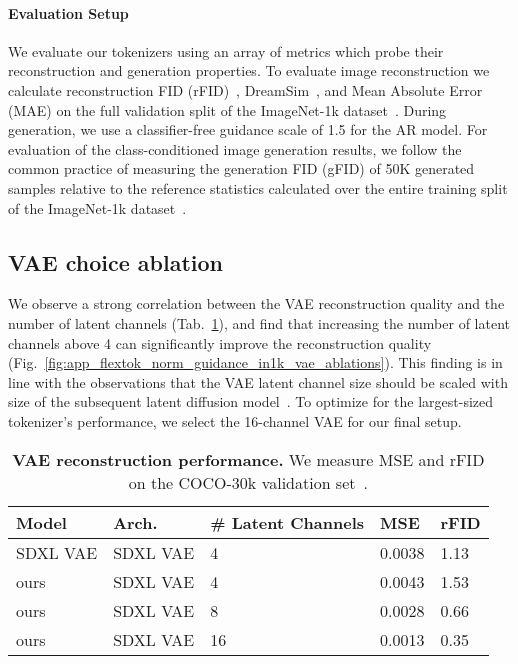 \paragraph{Evaluation Setup}
We evaluate our tokenizers using an array of metrics which probe their reconstruction and generation properties. To evaluate image reconstruction we calculate reconstruction FID (rFID)~\cite{Heusel2017FID}, DreamSim~\cite{Fu2023DreamSim}, and Mean Absolute Error (MAE) on the full validation split of the ImageNet-1k dataset~\cite{Russakovsky2014ImageNet}. During generation, we use a classifier-free guidance scale of 1.5 for the AR model. For evaluation of the class-conditioned image generation results, we follow the common practice of measuring the generation FID (gFID) of 50K generated samples relative to the reference statistics calculated over the entire training split of the ImageNet-1k dataset~\cite{dhariwal2021diffusion}. 


\subsection{VAE choice ablation}
\label{sec:app_vae_choice_ablation}
We observe a strong correlation between the VAE reconstruction quality and the number of latent channels (Tab.~\ref{tab:vae_num_ch_comparison}), and find that increasing the number of latent channels above 4 can significantly improve the \ours reconstruction quality (Fig.~\ref{fig:app_flextok_norm_guidance_in1k_vae_ablations}). This finding is in line with the observations that the VAE latent channel size should be scaled with size of the subsequent latent diffusion model~\cite{Esser2024SD3}. To optimize for the largest-sized tokenizer's performance, we select the 16-channel VAE for our final setup.

\begin{table}[ht!]
    \caption{\textbf{VAE reconstruction performance.} We measure MSE and rFID on the COCO-30k validation set~\cite{ms_coco_dataset}.}
    \label{tab:vae_num_ch_comparison}
    \centering
    \begin{tabular}{@{}lllll@{}}
        \toprule
        Model & Arch. & \# Latent Channels & MSE & rFID \\ 
        \midrule
        SDXL VAE & SDXL VAE & 4 & 0.0038 & 1.13\\
        \midrule
        ours  & SDXL VAE & 4 & 0.0043 & 1.53\\
        ours  & SDXL VAE & 8 & 0.0028 & 0.66\\
        ours  & SDXL VAE & 16 & 0.0013 & 0.35\\
        \bottomrule
    \end{tabular}
\end{table}

